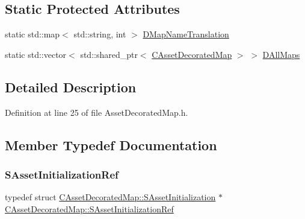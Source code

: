 \subsection*{Static Protected Attributes}
\begin{DoxyCompactItemize}
\item 
static std\+::map$<$ std\+::string, int $>$ \hyperlink{classCAssetDecoratedMap_afe82d461911e52b7e088da903166f1b3}{D\+Map\+Name\+Translation}
\item 
static std\+::vector$<$ std\+::shared\+\_\+ptr$<$ \hyperlink{classCAssetDecoratedMap}{C\+Asset\+Decorated\+Map} $>$ $>$ \hyperlink{classCAssetDecoratedMap_a32cdd80c7e9d31d8ce5397dd6d61dc4b}{D\+All\+Maps}
\end{DoxyCompactItemize}


\subsection{Detailed Description}


Definition at line 25 of file Asset\+Decorated\+Map.\+h.



\subsection{Member Typedef Documentation}
\hypertarget{classCAssetDecoratedMap_adf8214d7d7e6125410f23bc7cff260d3}{}\label{classCAssetDecoratedMap_adf8214d7d7e6125410f23bc7cff260d3} 
\subsubsection{\texorpdfstring{S\+Asset\+Initialization\+Ref}{SAssetInitializationRef}}
{\footnotesize\ttfamily typedef  struct \hyperlink{structCAssetDecoratedMap_1_1SAssetInitialization}{C\+Asset\+Decorated\+Map\+::\+S\+Asset\+Initialization} $\ast$ \hyperlink{classCAssetDecoratedMap_adf8214d7d7e6125410f23bc7cff260d3}{C\+Asset\+Decorated\+Map\+::\+S\+Asset\+Initialization\+Ref}}

\hypertarget{classCAssetDecoratedMap_a0ec7974cf6754e6891f10774ddafa527}{}\label{classCAssetDecoratedMap_a0ec7974cf6754e6891f10774ddafa527} 
